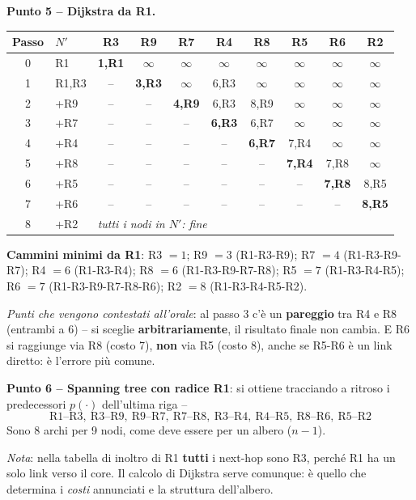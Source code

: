 \documentclass[12pt, a4paper]{article}
\begin{document}
\begin{tcolorbox}[colback=orange!5, colframe=orange!70!black, title=\textbf{Esercizio B.3 -- ``Company'' (traccia d'esame Lo Cigno)}]
\textbf{Punto 5 -- Dijkstra da R1.}
\begin{center}
\small
\begin{tabular}{clcccccccc}
\toprule
\textbf{Passo} & $N'$ & R3 & R9 & R7 & R4 & R8 & R5 & R6 & R2 \\
\midrule
0 & R1 & \textbf{1,R1} & $\infty$ & $\infty$ & $\infty$ & $\infty$ & $\infty$ & $\infty$ & $\infty$ \\
1 & R1,R3 & -- & \textbf{3,R3} & $\infty$ & 6,R3 & $\infty$ & $\infty$ & $\infty$ & $\infty$ \\
2 & +R9 & -- & -- & \textbf{4,R9} & 6,R3 & 8,R9 & $\infty$ & $\infty$ & $\infty$ \\
3 & +R7 & -- & -- & -- & \textbf{6,R3} & 6,R7 & $\infty$ & $\infty$ & $\infty$ \\
4 & +R4 & -- & -- & -- & -- & \textbf{6,R7} & 7,R4 & $\infty$ & $\infty$ \\
5 & +R8 & -- & -- & -- & -- & -- & \textbf{7,R4} & 7,R8 & $\infty$ \\
6 & +R5 & -- & -- & -- & -- & -- & -- & \textbf{7,R8} & 8,R5 \\
7 & +R6 & -- & -- & -- & -- & -- & -- & -- & \textbf{8,R5} \\
8 & +R2 & \multicolumn{8}{l}{\textit{tutti i nodi in $N'$: fine}} \\
\bottomrule
\end{tabular}
\end{center}

\textbf{Cammini minimi da R1}: R3 $=1$; R9 $=3$ (R1-R3-R9); R7 $=4$ (R1-R3-R9-R7); R4 $=6$ (R1-R3-R4); R8 $=6$ (R1-R3-R9-R7-R8); R5 $=7$ (R1-R3-R4-R5); R6 $=7$ (R1-R3-R9-R7-R8-R6); R2 $=8$ (R1-R3-R4-R5-R2).

\textit{Punti che vengono contestati all'orale}: al passo 3 c'è un \textbf{pareggio} tra R4 e R8 (entrambi a 6) -- si sceglie \textbf{arbitrariamente}, il risultato finale non cambia. E R6 si raggiunge via R8 (costo 7), \textbf{non} via R5 (costo 8), anche se R5-R6 è un link diretto: è l'errore più comune.

\textbf{Punto 6 -- Spanning tree con radice R1}: si ottiene tracciando a ritroso i predecessori $p(\cdot)$ dell'ultima riga --
$$\text{R1--R3},\ \text{R3--R9},\ \text{R9--R7},\ \text{R7--R8},\ \text{R3--R4},\ \text{R4--R5},\ \text{R8--R6},\ \text{R5--R2}$$
Sono 8 archi per 9 nodi, come deve essere per un albero ($n-1$).

\textit{Nota}: nella tabella di inoltro di R1 \textbf{tutti} i next-hop sono R3, perché R1 ha un solo link verso il core. Il calcolo di Dijkstra serve comunque: è quello che determina i \textit{costi} annunciati e la struttura dell'albero.
\end{tcolorbox}
\end{document}
